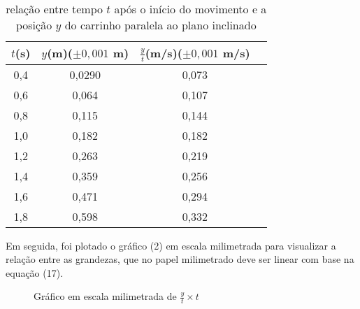 \documentclass[12pt, letterpaper]{article}
\begin{document}
     
    \begin{table}[!h]
        \centering
        \caption{relação entre tempo $t$ após o início do movimento e a posição $y$ do carrinho paralela ao plano inclinado}
         \begin{tabular}{| c | c | c | c |}
           \hline
             $t$(s)  & $y$(m)($\pm 0,001$ m) &  $\frac{y}{t}$(m/s)($\pm 0,001$ m/s)\\
            \hline
               0,4   &   0,0290   &   0,073   \\
           \hline    
               0,6   &   0,064   &   0,107   \\
           \hline    
               0,8   &   0,115  &   0,144   \\
           \hline    
               1,0   &   0,182  &   0,182   \\
           \hline    
               1,2   &   0,263  &   0,219 \\
           \hline    
               1,4   &   0,359  &   0,256   \\
           \hline    
               1,6    &  0,471  &   0,294  \\
           \hline
               1,8    &  0,598  &   0,332  \\
           \hline
        \end{tabular} 
        \label{tab:2}
    \end{table}

Em seguida, foi plotado o gráfico (2) em escala milimetrada para visualizar a relação entre as grandezas, que no papel milimetrado deve ser linear com base na equação (17).

\begin{figure}[!h]
    \centering
    \caption{Gráfico em escala milimetrada de $\frac{y}{t} \times t$}
    \label{fig:Elaborado pelos autores}
\end{figure}
\end{document}
